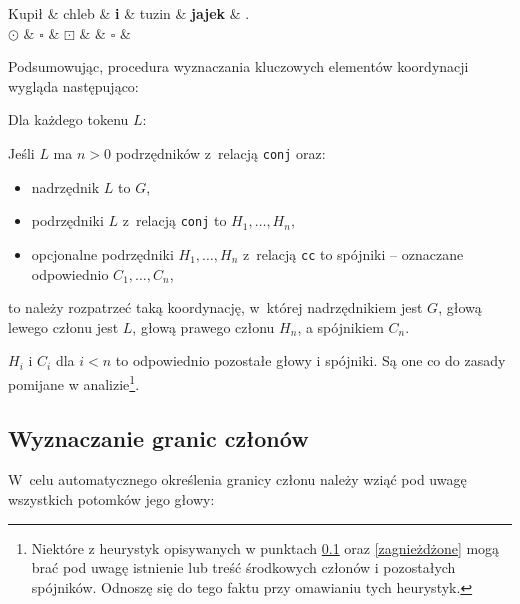 \begin{exe}
\ex \label{C}
\begin{dependency}[baseline=0.9ex]
\begin{deptext}[column sep=1em, row sep=.1ex]
Kupił \& chleb \& \textbf{i} \& tuzin \& \textbf{jajek} \& .  \\ 
$\odot$ \& $\square$ \& \textbf{$\boxdot$} \& \& $\square$ \& \\ 
\end{deptext}
\end{dependency}
\end{exe}

Podsumowując, procedura wyznaczania kluczowych elementów koordynacji wygląda następująco:

\begin{exe}
\ex 	\label{procedura}
Dla każdego tokenu $L$:

Jeśli $L$ ma $n>0$ podrzędników z~relacją \texttt{conj} oraz:

\begin{itemize}
\item nadrzędnik $L$ to $G$,
\item podrzędniki $L$ z~relacją \texttt{conj} to $H_{1}, \ldots , H_{n}$,
\item opcjonalne podrzędniki $H_{1}, \ldots , H_{n}$ z~relacją \texttt{cc} to spójniki -- oznaczane odpowiednio $C_{1}, \ldots , C_{n}$,
\end{itemize}

to należy rozpatrzeć taką koordynację, w~której nadrzędnikiem jest $G$, głową lewego członu jest $L$, głową prawego członu $H_{n}$, a spójnikiem $C_{n}$.
\end{exe}

$H_{i}$ i $C_{i}$ dla $i<n$ to odpowiednio pozostałe głowy i spójniki. Są one co do zasady pomijane w analizie\footnote{
Niektóre z heurystyk opisywanych w punktach \ref{heurystyki} oraz \ref{zagnieżdżone} mogą brać pod uwagę istnienie lub treść środkowych członów i pozostałych spójników. Odnoszę się do tego faktu przy omawianiu tych heurystyk.}.


\subsection{Wyznaczanie granic członów} \label{heurystyki}

W~celu automatycznego określenia granicy członu należy wziąć pod uwagę wszystkich potomków jego głowy:

